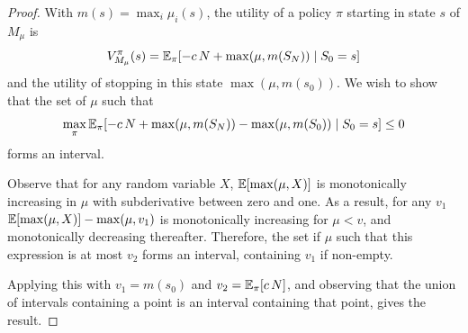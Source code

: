 \begin{hiddenproof}
	\begin{proof}
	With $m(s) = \max_i\mu_i(s)$, the utility of a policy $\pi$ starting in state $s$ of $M_\mu$ is
	\[
		V^\pi_{M_\mu}(s) = \mathbb{E}_{\pi}[-c\,N + \max(\mu,m(S_N)) \mid S_0=s]
	\]
	and the utility of stopping in this state $\max(\mu,m(s_0))$.
	We wish to show that the set of $\mu$ such that
	\[
		\max_\pi \mathbb{E}_{\pi}[-c\,N + \max(\mu,m(S_N)) - \max(\mu,m(S_0)) \mid S_0=s] \le 0
	\]
	forms an interval.  

	Observe that for any random variable $X$, 
		$\mathbb{E}[\max(\mu,X)]$ is monotonically increasing in $\mu$ with subderivative between zero and one.
	As a result, for any $v_1$
		$\mathbb{E}[\max(\mu,X)] - \max(\mu,v_1)$ 
		is monotonically increasing for $\mu<v$, 
		and monotonically decreasing thereafter.
	Therefore, the set if $\mu$ such that this expression is at most $v_2$ forms an interval, containing $v_1$ if non-empty.

	Applying this with $v_1 = m(s_0)$ and $v_2=\mathbb{E}_{\pi}[c\,N]$, and observing that the union of intervals containing
	a point is an interval containing that point, gives the result.
	\end{proof}	
\end{hiddenproof}

